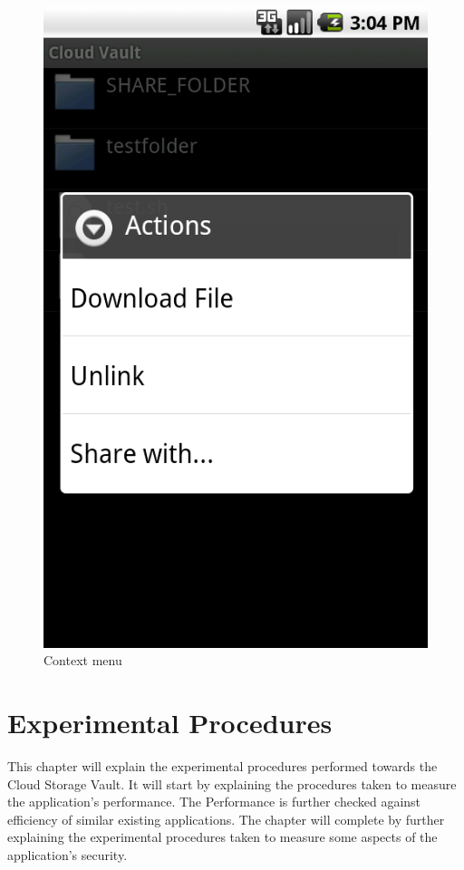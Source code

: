 \documentclass[pdftex,english,10pt,b5paper,twoside]{book}
\begin{document}
\begin{figure}[h!]
    \centering
    \includegraphics[scale=0.4]{client-browsecontext.png}
    \caption{Context menu}
    \label{fig:CSVAndroid:remotecontext}
\end{figure}

\chapter{Experimental Procedures}
This chapter will explain the experimental procedures performed towards the Cloud
Storage Vault. It will start by explaining the
procedures taken to measure the application's performance. The Performance is
further checked against efficiency of similar existing applications.
The chapter will complete by further explaining the experimental procedures
taken to measure some aspects of the application's security.
\end{document}
